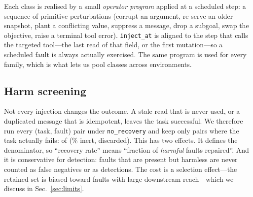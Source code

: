 Each class is realised by a small \emph{operator program} applied at a scheduled step: a sequence of
primitive perturbations (corrupt an argument, re-serve an older snapshot, plant a conflicting value,
suppress a message, drop a subgoal, swap the objective, raise a terminal tool error). \texttt{inject\_at}
is aligned to the step that calls the targeted tool---the last read of that field, or the first
mutation---so a scheduled fault is always actually exercised. The same program is used for every
family, which is what lets us pool classes across environments.

\subsection{Harm screening}

Not every injection changes the outcome. A stale read that is never used, or a duplicated message
that is idempotent, leaves the task successful. We therefore run every (task, fault) pair under
\texttt{no\_recovery} and keep only pairs where the task actually fails: \NumHarmful{} of
\NumPairs{} (\InertPct\% inert, discarded). This has two effects. It defines the denominator, so
``recovery rate'' means ``fraction of \emph{harmful} faults repaired''. And it is conservative for
detection: faults that are present but harmless are never counted as false negatives or as
detections. The cost is a selection effect---the retained set is biased toward faults with large
downstream reach---which we discuss in Sec.~\ref{sec:limits}.
